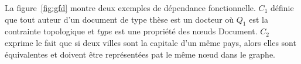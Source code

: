 \begin{example}
    La figure~\ref{fig:gfd} montre deux exemples de dépendance fonctionnelle.
    $C_1$ définie que tout auteur d'un document de type thèse est un docteur où $Q_1$ est la contrainte topologique et $type$ est une propriété des nœuds Document.
    $C_2$ exprime le fait que si deux villes sont la capitale d'un même pays, alors elles sont équivalentes et doivent être représentées pat le même nœud dans le graphe.
\end{example}

\FloatBarrier
